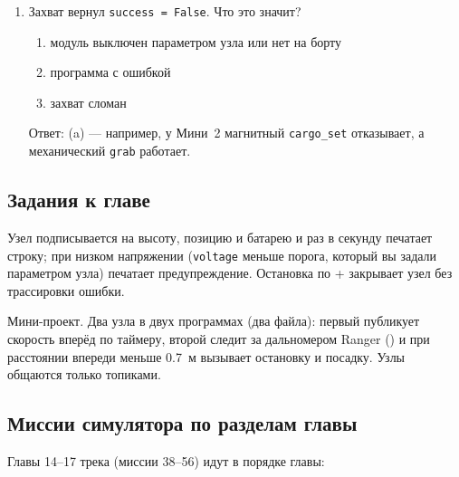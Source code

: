 \begin{enumerate}
    Ответ: (b). Меняют только этим сервисом; в воздухе у Мини~2 он отказывает (\verb|nav_system_change_in_flight: false|).
  \item Захват вернул \verb|success = False|. Что это значит?
    \begin{enumerate}[label=(\alph*)] \item модуль выключен параметром узла или нет на борту \item программа с ошибкой \item захват сломан \end{enumerate}
    Ответ: (a) --- например, у Мини~2 магнитный \verb|cargo_set| отказывает, а механический \verb|grab| работает.
\end{enumerate}

\subsection{Задания к главе}

\begin{taskbox}
Узел подписывается на высоту, позицию и батарею и раз в секунду печатает строку; при низком напряжении (\verb|voltage| меньше порога, который вы задали параметром узла) печатает предупреждение. Остановка по + закрывает узел без трассировки ошибки.
\end{taskbox}

\begin{taskbox}
Мини-проект. Два узла в двух программах (два файла): первый публикует скорость вперёд по таймеру, второй следит за дальномером Ranger () и при расстоянии впереди меньше 0.7~м вызывает остановку и посадку. Узлы общаются только топиками.
\end{taskbox}

\subsection{Миссии симулятора по разделам главы}

Главы 14--17 трека  (миссии 38--56) идут в порядке главы:

